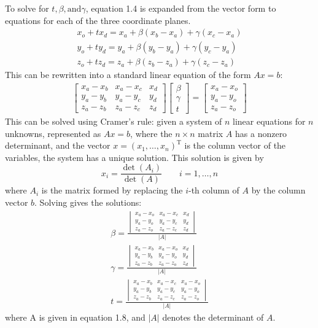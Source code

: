 \documentclass[12pt]{report}
\begin{document}
To solve for $t, \beta, \text{and} \gamma$, equation 1.4 is expanded from the vector form to equations for each of the three coordinate planes.
\begin{align}
x_o + tx_d = x_a + \beta(x_b-x_a) + \gamma(x_c-x_a) \\
y_o + ty_d = y_a + \beta(y_b-y_a) + \gamma(y_c-y_a) \\
z_o + tz_d = z_a + \beta(z_b-z_a) + \gamma(z_c-z_a)
\end{align}
This can be rewritten into a standard linear equation of the form $Ax = b$:
\begin{align}
\begin{bmatrix}
x_a - x_b & x_a - x_c & x_d \\
y_a - y_b & y_a - y_c & y_d \\
z_a - z_b & z_a - z_c & z_d
\end{bmatrix}
\begin{bmatrix}
\beta \\ \gamma \\ t
\end{bmatrix}
= \begin{bmatrix}
x_a - x_o \\ y_a - y_o \\ z_a - z_o
\end{bmatrix}
\end{align}
This can be solved using Cramer's rule: given a system of $n$ linear equations for $n$ unknowns, represented as $Ax = b$, where the $n \times n$ matrix $A$ has a nonzero determinant, and the vector $x = (x_1, \ldots, x_n)^\mathrm{T}$ is the column vector of the variables, the system has a unique solution.
This solution is given by
\begin{equation}
x_i = \frac{\det(A_i)}{\det(A)} \qquad i = 1, \ldots, n
\end{equation}
where  $A_i$  is the matrix formed by replacing the $i$-th column of $A$ by the column vector $b$.
Solving gives the solutions:
\begin{align}
\beta = \frac{\begin{vmatrix}
x_a - x_o & x_a - x_c & x_d \\
y_a - y_o & y_a - y_c & y_d \\
z_a - z_o & z_a - z_c & z_d
\end{vmatrix}}{|A|} \\
\gamma = \frac{\begin{vmatrix}
x_a - x_b & x_a - x_o & x_d \\
y_a - y_b & y_a - y_o & y_d \\
z_a - z_b & z_a - z_o & z_d
\end{vmatrix}}{|A|} \\
t = \frac{\begin{vmatrix}
x_a - x_b & x_a - x_c & x_a - x_o \\
y_a - y_b & y_a - y_c & y_a - y_o \\
z_a - z_b & z_a - z_c & z_a - z_o
\end{vmatrix}}{|A|} 
\end{align}
where A is given in equation 1.8, and $|A|$ denotes the determinant of $A$.
\end{document}
